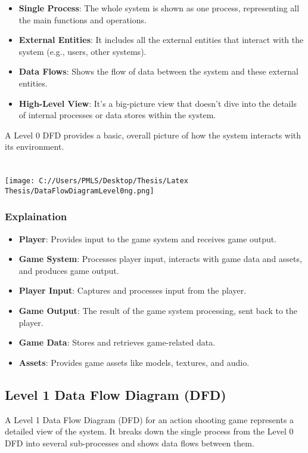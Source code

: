 \begin{itemize}
	\item \textbf{Single Process}: The whole system is shown as one process, representing all the main functions and operations.
	\item \textbf{External Entities}: It includes all the external entities that interact with the system (e.g., users, other systems).
	\item \textbf{Data Flows}: Shows the flow of data between the system and these external entities.
	\item \textbf{High-Level View}: It’s a big-picture view that doesn't dive into the details of internal processes or data stores within the system.
\end{itemize}

A Level 0 DFD provides a basic, overall picture of how the system interacts with its environment.
\\
\\
\\

\texttt{[image: C://Users/PMLS/Desktop/Thesis/Latex Thesis/DataFlowDiagramLevel0ng.png]}

\subsubsection{Explaination}

\begin{itemize}
	\item \textbf{Player}: Provides input to the game system and receives game output.
	\item \textbf{Game System}: Processes player input, interacts with game data and assets, and produces game output.
	\item \textbf{Player Input}: Captures and processes input from the player.
	\item \textbf{Game Output}: The result of the game system processing, sent back to the player.
	\item \textbf{Game Data}: Stores and retrieves game-related data.
	\item \textbf{Assets}: Provides game assets like models, textures, and audio.
\end{itemize}

\subsection{Level 1 Data Flow Diagram (DFD)}
A Level 1 Data Flow Diagram (DFD) for an action shooting game represents a detailed view of the system. It breaks down the single process from the Level 0 DFD into several sub-processes and shows data flows between them.

